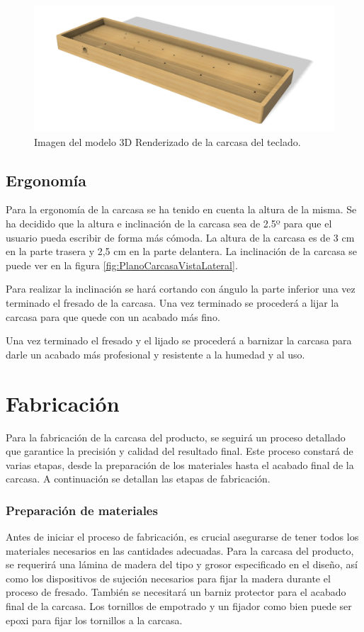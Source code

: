 \begin{figure}[H]
    \centering
    \includegraphics[width=1\textwidth]{imagenes/Capitulos/Cap06/Modelo3DRender.png}
    \caption{Imagen del modelo 3D Renderizado de la carcasa del teclado.}
    \label{fig:Modelo3DRender}
\end{figure}

\subsection{Ergonomía}
Para la ergonomía de la carcasa se ha tenido en cuenta la altura de la misma. Se ha decidido que la altura e inclinación de la carcasa sea de 2.5º para que el usuario pueda escribir de forma más cómoda. La altura de la carcasa es de 3 cm en la parte trasera y 2,5 cm en la parte delantera. La inclinación de la carcasa se puede ver en la figura \ref{fig:PlanoCarcasaVistaLateral}.

Para realizar la inclinación se hará cortando con ángulo la parte inferior una vez terminado el fresado de la carcasa. Una vez terminado se procederá a lijar la carcasa para que quede con un acabado más fino.

Una vez terminado el fresado y el lijado se procederá a barnizar la carcasa para darle un acabado más profesional y resistente a la humedad y al uso.

\section{Fabricación}
Para la fabricación de la carcasa del producto, se seguirá un proceso detallado que garantice la precisión y calidad del resultado final. Este proceso constará de varias etapas, desde la preparación de los materiales hasta el acabado final de la carcasa. A continuación se detallan las etapas de fabricación.

\subsubsection{Preparación de materiales}
Antes de iniciar el proceso de fabricación, es crucial asegurarse de tener todos los materiales necesarios en las cantidades adecuadas. Para la carcasa del producto, se requerirá una lámina de madera del tipo y grosor especificado en el diseño, así como los dispositivos de sujeción necesarios para fijar la madera durante el proceso de fresado. También se necesitará un barniz protector para el acabado final de la carcasa. Los tornillos de empotrado y un fijador como bien puede ser epoxi para fijar los tornillos a la carcasa.

